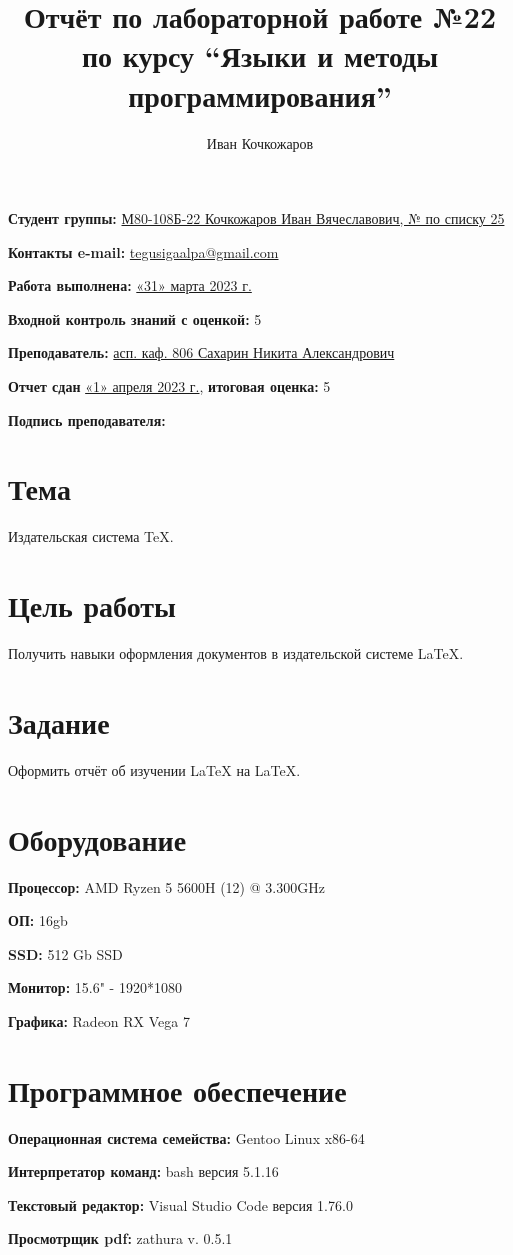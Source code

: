 \documentclass[12pt, letterpaper]{article}
\title{Отчёт по лабораторной работе №22 по курсу “Языки и методы программирования”}
\author{Иван Кочкожаров}
\begin{document}
\maketitle
\begin{description}
\item\textbf{Студент группы:} \underline{М80-108Б-22 Кочкожаров Иван Вячеславович, № по списку 25}    
\item\textbf{Контакты e-mail:} \underline{tegusigaalpa@gmail.com}
\item\textbf{Работа выполнена:} \underline{«31» марта 2023 г.}
\item\textbf{Входной контроль знаний с оценкой:} 5
\item\textbf{Преподаватель:} \underline{асп. каф. 806 Сахарин Никита Александрович}
\item\textbf{Отчет сдан} \underline{«1» апреля 2023 г.}, \textbf{итоговая оценка:} 5
\item\textbf{Подпись преподавателя:} \underline{\hspace{3cm}}
\end{description}
\section{Тема}
Издательская система \TeX{}.
\section{Цель работы}
Получить навыки оформления документов в издательской системе \LaTeX{}.
\section{Задание}
Оформить отчёт об изучении \LaTeX{} на \LaTeX{}.
\section{Оборудование}
\begin{description}
\item\textbf{Процессор:} AMD Ryzen 5 5600H (12) @ 3.300GHz
\item\textbf{ОП:} 16gb
\item\textbf{SSD:} 512 Gb SSD
\item\textbf{Монитор:} 15.6" - 1920*1080
\item\textbf{Графика:} Radeon RX Vega 7
\end{description}
\section{Программное обеспечение}
\begin{description}
\item\textbf{Операционная система семейства:} Gentoo Linux x86-64
\item\textbf{Интерпретатор команд:} bash версия 5.1.16
\item\textbf{Текстовый редактор:} Visual Studio Code версия 1.76.0
\item\textbf{Просмотрщик pdf:} zathura v. 0.5.1
\end{description}
\end{document}
